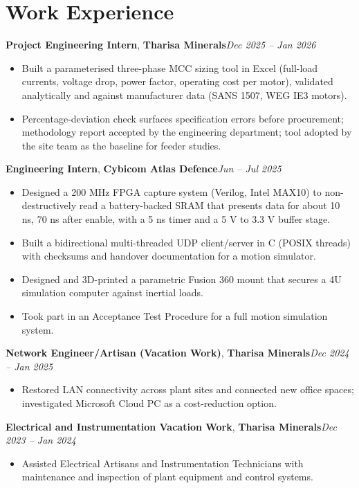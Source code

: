 \documentclass[10pt,a4paper]{article}
\newcommand{\role}[3]{\textbf{#1}, \textbf{#2}\hfill\textit{#3}\par\vspace{-1pt}}
\begin{document}
\section*{Work Experience}
\role{Project Engineering Intern}{Tharisa Minerals}{Dec 2025 -- Jan 2026}
\begin{itemize}
\item Built a parameterised three-phase MCC sizing tool in Excel (full-load currents, voltage drop, power factor, operating cost per motor), validated analytically and against manufacturer data (SANS 1507, WEG IE3 motors).
\item Percentage-deviation check surfaces specification errors before procurement; methodology report accepted by the engineering department; tool adopted by the site team as the baseline for feeder studies.
\end{itemize}
\role{Engineering Intern}{Cybicom Atlas Defence}{Jun -- Jul 2025}
\begin{itemize}
\item Designed a 200 MHz FPGA capture system (Verilog, Intel MAX10) to non-destructively read a battery-backed SRAM that presents data for about 10 ns, 70 ns after enable, with a 5 ns timer and a 5 V to 3.3 V buffer stage.
\item Built a bidirectional multi-threaded UDP client/server in C (POSIX threads) with checksums and handover documentation for a motion simulator.
\item Designed and 3D-printed a parametric Fusion 360 mount that secures a 4U simulation computer against inertial loads.
\item Took part in an Acceptance Test Procedure for a full motion simulation system.
\end{itemize}
\role{Network Engineer/Artisan (Vacation Work)}{Tharisa Minerals}{Dec 2024 -- Jan 2025}
\begin{itemize}
\item Restored LAN connectivity across plant sites and connected new office spaces; investigated Microsoft Cloud PC as a cost-reduction option.
\end{itemize}
\role{Electrical and Instrumentation Vacation Work}{Tharisa Minerals}{Dec 2023 -- Jan 2024}
\begin{itemize}
\item Assisted Electrical Artisans and Instrumentation Technicians with maintenance and inspection of plant equipment and control systems.
\end{itemize}
\end{document}
